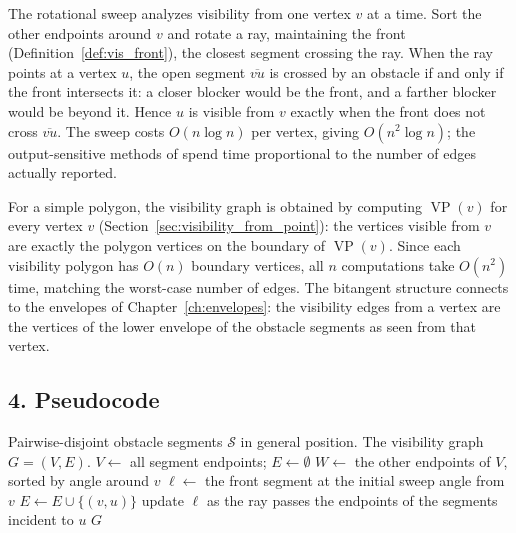 The rotational sweep analyzes visibility from one vertex $v$ at a time.
Sort the other endpoints around $v$ and rotate a ray, maintaining the front
(Definition~\ref{def:vis_front}), the closest segment crossing the ray. When
the ray points at a vertex $u$, the open segment $\overline{vu}$ is crossed
by an obstacle if and only if the front intersects it: a closer blocker
would be the front, and a farther blocker would be beyond it. Hence $u$ is
visible from $v$ exactly when the front does not cross $\overline{vu}$. The
sweep costs $O(n \log n)$ per vertex, giving $O(n^2 \log n)$; the
output-sensitive methods of \cite{ghoshmount1991,overmarswelzl1992} spend
time proportional to the number of edges actually reported.

For a simple polygon, the visibility graph is obtained by computing
$\operatorname{VP}(v)$ for every vertex $v$
(Section~\ref{sec:visibility_from_point}): the vertices visible from $v$
are exactly the polygon vertices on the boundary of $\operatorname{VP}(v)$.
Since each visibility polygon has $O(n)$ boundary vertices, all $n$
computations take $O(n^2)$ time, matching the worst-case number of edges.
The bitangent structure connects to the envelopes of Chapter~\ref{ch:envelopes}:
the visibility edges from a vertex are the vertices of the lower envelope of
the obstacle segments as seen from that vertex.

\subsection{4. Pseudocode}

\begin{algorithm}[htbp]
\caption{Rotational Sweep for the Visibility Graph}
\label{alg:vis_vg_sweep}
\begin{algorithmic}[1]
\Require Pairwise-disjoint obstacle segments $\mathcal{S}$ in general position.
\Ensure The visibility graph $G = (V, E)$.
  \State $V \gets$ all segment endpoints; $E \gets \emptyset$
    \State $W \gets$ the other endpoints of $V$, sorted by angle around $v$
    \State $\ell \gets$ the front segment at the initial sweep angle from $v$
        \State $E \gets E \cup \{(v,u)\}$ 
      \EndIf
      \State update $\ell$ as the ray passes the endpoints of the segments incident to $u$
    \EndFor
  \EndFor
  \State \Return $G$
\EndFunction
\end{algorithmic}
\end{algorithm}


